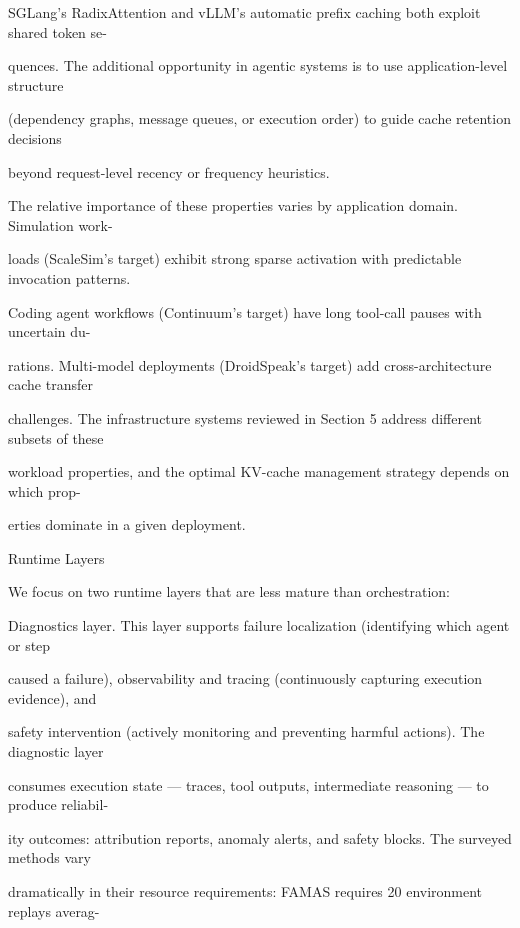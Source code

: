 \begin{flushleft}
\noindent SGLang’s RadixAttention and vLLM’s automatic prefix caching both exploit shared token se-\par
\noindent quences. The additional opportunity in agentic systems is to use application-level structure\par
\noindent (dependency graphs, message queues, or execution order) to guide cache retention decisions\par
\noindent beyond request-level recency or frequency heuristics.\par
\noindent  The relative importance of these properties varies by application domain. Simulation work-\par
\noindent loads (ScaleSim’s target) exhibit strong sparse activation with predictable invocation patterns.\par
\noindent Coding agent workflows (Continuum’s target) have long tool-call pauses with uncertain du-\par
\noindent rations. Multi-model deployments (DroidSpeak’s target) add cross-architecture cache transfer\par
\noindent challenges. The infrastructure systems reviewed in Section 5 address different subsets of these\par
\noindent workload properties, and the optimal KV-cache management strategy depends on which prop-\par
\noindent erties dominate in a given deployment.\par
\par\smallskip
{} Runtime Layers\par
\noindent We focus on two runtime layers that are less mature than orchestration:\par
\par\smallskip
\noindent Diagnostics layer. This layer supports failure localization (identifying which agent or step\par
\noindent caused a failure), observability and tracing (continuously capturing execution evidence), and\par
\noindent safety intervention (actively monitoring and preventing harmful actions). The diagnostic layer\par
\noindent consumes execution state — traces, tool outputs, intermediate reasoning — to produce reliabil-\par
\noindent ity outcomes: attribution reports, anomaly alerts, and safety blocks. The surveyed methods vary\par
\noindent dramatically in their resource requirements: FAMAS requires 20 environment replays averag-\par

\end{flushleft}
